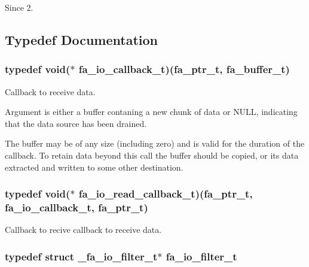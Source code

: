 \begin{DoxySince}{Since}
2. 
\end{DoxySince}


\subsection{Typedef Documentation}
\hypertarget{group___fa_io_gaa151f2c484756349795513fdf67a0268}{
\subsubsection[{fa\-\_\-io\-\_\-callback\-\_\-t}]{\setlength{\rightskip}{0pt plus 5cm}typedef void($\ast$  fa\-\_\-io\-\_\-callback\-\_\-t)({\bf fa\-\_\-ptr\-\_\-t}, {\bf fa\-\_\-buffer\-\_\-t})}}\label{group___fa_io_gaa151f2c484756349795513fdf67a0268}


Callback to receive data. 

Argument is either a buffer contaning a new chunk of data or {\ttfamily N\-U\-L\-L}, indicating that the data source has been drained.

The buffer may be of any size (including zero) and is valid for the duration of the callback. To retain data beyond this call the buffer should be copied, or its data extracted and written to some other destination. \hypertarget{group___fa_io_gabadf768f91c382d0700638f384f48416}{
\subsubsection[{fa\-\_\-io\-\_\-read\-\_\-callback\-\_\-t}]{\setlength{\rightskip}{0pt plus 5cm}typedef void($\ast$  fa\-\_\-io\-\_\-read\-\_\-callback\-\_\-t)({\bf fa\-\_\-ptr\-\_\-t}, {\bf fa\-\_\-io\-\_\-callback\-\_\-t}, {\bf fa\-\_\-ptr\-\_\-t})}}\label{group___fa_io_gabadf768f91c382d0700638f384f48416}


Callback to recive callback to receive data. 

\hypertarget{group___fa_io_ga3e1f11810efcba3b45842e10c1425aba}{
\subsubsection[{fa\-\_\-io\-\_\-filter\-\_\-t}]{\setlength{\rightskip}{0pt plus 5cm}typedef struct \-\_\-fa\-\_\-io\-\_\-filter\-\_\-t$\ast$ {\bf fa\-\_\-io\-\_\-filter\-\_\-t}}}\label{group___fa_io_ga3e1f11810efcba3b45842e10c1425aba}


